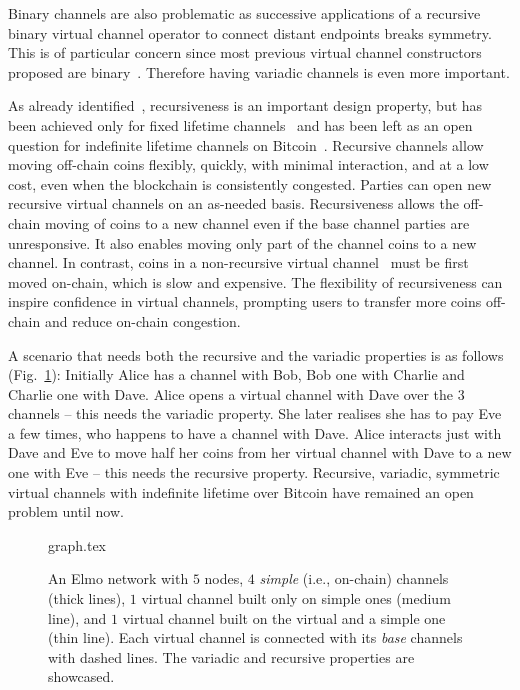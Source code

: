 Binary channels are also problematic as successive applications
of a recursive binary virtual channel operator to connect distant endpoints
breaks symmetry. This is of
particular concern since most previous virtual channel constructors proposed are
binary~\cite{DBLP:conf/ccs/DziembowskiFH18,9519487,10.1007/978-3-030-65411-5_18}.
Therefore having variadic channels is even more important.

As already identified~\cite{DBLP:conf/ccs/DziembowskiFH18}, recursiveness is an
important design property, but has been achieved only for fixed lifetime
channels~\cite{10.1007/978-3-030-65411-5_18} and has been left as an open
question for indefinite lifetime channels on Bitcoin~\cite{9519487}. Recursive
channels allow moving off-chain coins flexibly, quickly, with minimal
interaction, and at a low cost, even when the blockchain is consistently congested.
Parties can open new recursive virtual channels on an as-needed basis.
Recursiveness allows the off-chain moving of coins to a new channel even if the
base channel parties are unresponsive. It also enables moving only part of the
channel coins to a new channel. In contrast, coins in a non-recursive virtual
channel~\cite{donner} must be first moved on-chain, which is slow and expensive.
The flexibility of recursiveness can inspire confidence in virtual channels,
prompting users to transfer more coins off-chain and reduce on-chain congestion.

A scenario that needs both the recursive and the variadic
properties is as follows (Fig.~\ref{figure:graph}): Initially Alice has a channel with
Bob, Bob one with Charlie and Charlie one with Dave. Alice opens a virtual
channel with Dave over the $3$ channels -- this needs the variadic property.
She later realises she has to pay Eve a few
times, who happens to have a channel with Dave. Alice interacts just with
Dave and Eve to move half her coins from her virtual channel with Dave to a
new one with Eve -- this needs the recursive property.
Recursive,
variadic, symmetric virtual channels with indefinite lifetime over Bitcoin have
remained an open problem until now.

\begin{figure}[!htbp]
  \centering
  {graph.tex}
  \caption{An Elmo network with $5$ nodes, $4$ \emph{simple}
  (i.e., on-chain) channels (thick lines), $1$ virtual channel built only on
  simple ones (medium line),
  and $1$ virtual channel built on the virtual and a simple one (thin line). Each
  virtual channel is connected with its \emph{base} channels with dashed lines. The variadic and recursive properties are showcased.}
  \label{figure:graph}
\end{figure}

